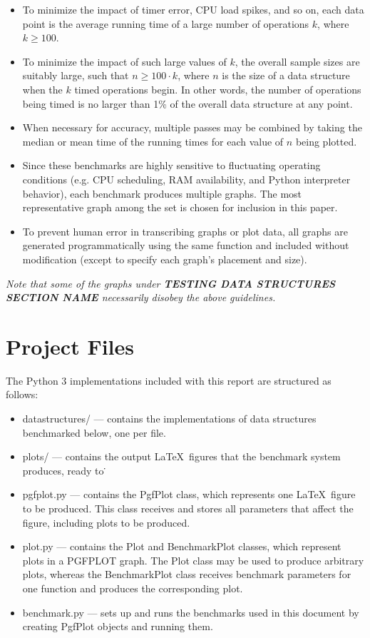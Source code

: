 \documentclass{article}
\newcommand {\todo}[1] {{\textbf{\color{red}#1}}}
\begin{document}
\begin{itemize}
    \item To minimize the impact of timer error, CPU load spikes, and so on, each data point is the average running time of a large number of operations $k$, where $k \geq 100$.
    \item To minimize the impact of such large values of $k$, the overall sample sizes are suitably large, such that $n \geq 100 \cdot k$, where $n$ is the size of a data structure when the $k$ timed operations begin. In other words, the number of operations being timed is no larger than 1\% of the overall data structure at any point.
    \item When necessary for accuracy, multiple passes may be combined by taking the median or mean time of the running times for each value of $n$ being plotted.
    \item Since these benchmarks are highly sensitive to fluctuating operating conditions (e.g. CPU scheduling, RAM availability, and Python interpreter behavior), each benchmark produces multiple graphs. The most representative graph among the set is chosen for inclusion in this paper.
    \item To prevent human error in transcribing graphs or plot data, all graphs are generated programmatically using the same function and included without modification (except to specify each graph's placement and size).
\end{itemize}

\emph{Note that some of the graphs under \todo{TESTING DATA STRUCTURES SECTION NAME} necessarily disobey the above guidelines.}

\section{Project Files}
The Python 3 implementations included with this report are structured as follows:
\begin{itemize}
    \item datastructures/ --- contains the implementations of data structures benchmarked below, one per file.
    \item plots/ --- contains the output \LaTeX \ figures that the benchmark system produces, ready to \.
    \item pgfplot.py --- contains the PgfPlot class, which represents one \LaTeX \ figure to be produced. This class receives and stores all parameters that affect the figure, including plots to be produced.
    \item plot.py --- contains the Plot and BenchmarkPlot classes, which represent plots in a PGFPLOT graph. The Plot class may be used to produce arbitrary plots, whereas the BenchmarkPlot class receives benchmark parameters for one function and produces the corresponding plot.
    \item benchmark.py --- sets up and runs the benchmarks used in this document by creating PgfPlot objects and running them.
\end{itemize}
\end{document}

